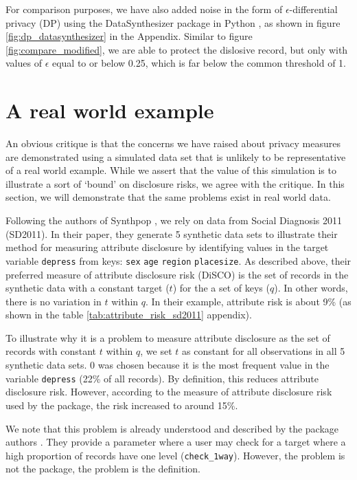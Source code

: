 \documentclass[runningheads]{llncs}
\begin{document}
For comparison purposes, we have also added noise in the form of $\epsilon$-differential privacy (DP) using the DataSynthesizer package in Python \cite{ping2017datasynthesizer}, as shown in figure \ref{fig:dp_datasynthesizer} in the Appendix.  Similar to figure \ref{fig:compare_modified}, we are able to protect the dislosive record, but only with values of $\epsilon$ equal to or below 0.25, which is far below the common threshold of 1. 

\section{A real world example}

An obvious critique is that the concerns we have raised about privacy measures are demonstrated using a simulated data set that is unlikely to be representative of a real world example.  While we assert that the value of this simulation is to illustrate a sort of `bound' on disclosure risks, we agree with the critique.  In this section, we will demonstrate that the same problems exist in real world data.

Following the authors of Synthpop \cite{raab2024practical}, we rely on data from Social Diagnosis 2011 (SD2011).  In their paper, they generate 5 synthetic data sets to illustrate their method for measuring attribute disclosure by identifying values in the target variable \texttt{depress} from keys: \texttt{sex} \texttt{age} \texttt{region} \texttt{placesize}.  As described above, their preferred measure of attribute disclosure risk (DiSCO) is the set of records in the synthetic data with a constant target ($t$) for the a set of keys ($q$).  In other words, there is no variation in $t$ within $q$.  In their example, attribute risk is about 9\%  (as shown in the table \ref{tab:attribute_risk_sd2011} appendix).  

To illustrate why it is a problem to measure attribute disclosure as the set of records with constant $t$ within $q$, we set $t$ as constant for all observations in all 5 synthetic data sets.  0 was chosen because it is the most frequent value in the variable \texttt{depress} (22\% of all records).  By definition, this reduces attribute disclosure risk.  However, according to the measure of attribute disclosure risk used by the package, the risk increased to around 15\%.

We note that this problem is already understood and described by the package authors \cite{raab2024practical}.  They provide a parameter where a user may check for a target where a high proportion of records have one level (\texttt{check\_1way}).  However, the problem is not the package, the problem is the definition.
\end{document}
